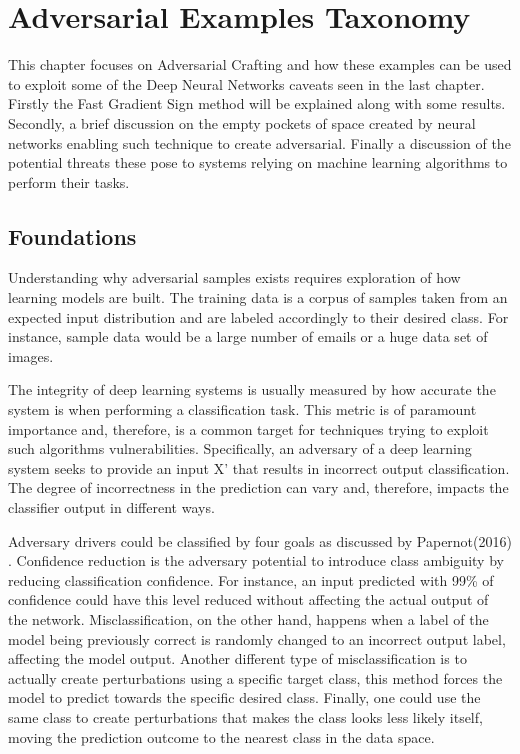 \chapter{Adversarial Examples Taxonomy}

This chapter focuses on Adversarial Crafting and how these examples can be used to exploit some of the Deep Neural Networks caveats seen in the last chapter. Firstly the Fast Gradient Sign method will be explained along with some results. Secondly, a brief discussion on the empty pockets of space created by neural networks enabling such technique to create adversarial. Finally a discussion of the potential threats these pose to systems relying on machine learning algorithms to perform their tasks.


\section{Foundations}

Understanding why adversarial samples exists requires exploration of how learning models are built. The training data is a corpus of samples taken from an expected input distribution and are labeled accordingly to their desired class. For instance, sample data would be a large number of emails or a huge data set of images.

The integrity of deep learning systems is usually measured by how accurate the system is when performing a classification task. This metric is of paramount importance and, therefore, is a common target for techniques trying to exploit such algorithms vulnerabilities. Specifically, an adversary of a deep learning system seeks to provide an input X' that results in incorrect output classification. The degree of incorrectness in the prediction can vary and, therefore, impacts the classifier output in different ways.

Adversary drivers could be classified by four goals as discussed by Papernot(2016) \cite{papernot_thesis_2016}. Confidence reduction is the adversary potential to introduce class ambiguity by reducing classification confidence. For instance, an input predicted with 99\% of confidence could have this level reduced without affecting the actual output of the network. Misclassification, on the other hand, happens when a label of the model being previously correct is randomly changed to an incorrect output label, affecting the model output. Another different type of misclassification is to actually create perturbations using a specific target class, this method forces the model to predict towards the specific desired class. Finally, one could use the same class to create perturbations that makes the class looks less likely itself, moving the prediction outcome to the nearest class in the data space.

